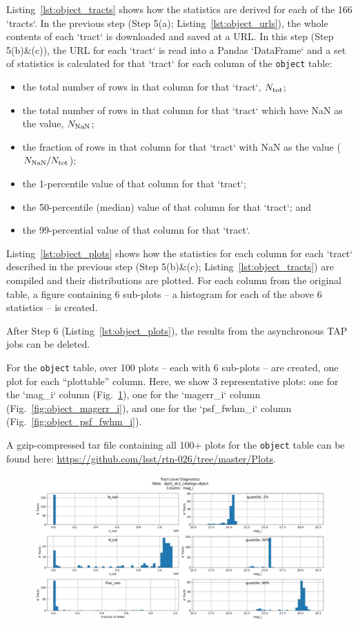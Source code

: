 \documentclass[DM,authoryear,toc]{lsstdoc}
\begin{document}
Listing~\ref{lst:object_tracts} shows how the statistics are derived
for each of the 166 `tracts`.  In the previous step (Step 5(a);
Listing~\ref{lst:object_urls}), the whole contents of each `tract` is
downloaded and saved at a URL.  In this step (Step 5(b)\&(c)), the URL
for each `tract` is read into a Pandas `DataFrame` and a set of
statistics is calculated for that `tract` for each column of the 
\texttt{object} table:
\begin{itemize}
\item the total number of rows in that column for that `tract`, $N_{\rm tot}$;
\item the total number of rows in that column for that `tract` which have NaN as the value, $N_{\rm NaN}$;
\item the fraction of rows in that column for that `tract` with NaN as the value ($N_{\rm NaN} / N_{\rm tot}$);
\item the 1-percentile value of that column for that `tract`;
\item the 50-percentile (median) value of that column for that `tract`; and 
\item the 99-percential value of that column for that `tract`.
\end{itemize}

Listing~\ref{lst:object_plots} shows how the statistics for each
column for each `tract` described in the previous step (Step
5(b)\&(c); Listing~\ref{lst:object_tracts}) are compiled and their
distributions are plotted.  For each column from the original table, a
figure containing 6 sub-plots -- a histogram for each of the above 6
statistics -- is created.

After Step 6 (Listing~\ref{lst:object_plots}), the results from the
asynchronous TAP jobs can be deleted.

For the \texttt{object} table, over 100 plots -- each with 6 sub-plots
-- are created, one plot for each ``plottable'' column.  Here, we show
3 representative plots: one for the `mag\_i` column
(Fig.~\ref{fig:object_mag_i}), one for the `magerr\_i` column
(Fig.~\ref{fig:object_magerr_i}), and one for the `psf\_fwhm\_i` column
(Fig.~\ref{fig:object_psf_fwhm_i}).

A gzip-compressed tar file containing all 100$+$ plots for the
\texttt{object} table can be found here:
\url{https://github.com/lsst/rtn-026/tree/master/Plots}.

\begin{figure}[h]
\centering
\includegraphics[width=1.0\linewidth]{Plots/object_mag_i.pdf}
\caption{}
\label{fig:object_mag_i}
\end{figure}
\end{document}
